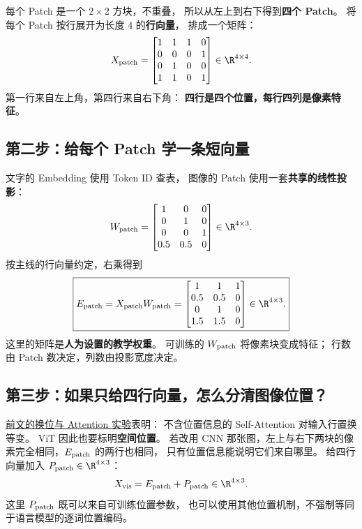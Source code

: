 每个 Patch 是一个 $2\times2$ 方块，不重叠，
所以从左上到右下得到\textbf{四个 Patch}。
将每个 Patch 按行展开为长度 $4$ 的\textbf{行向量}，
排成一个矩阵：
\begin{equation}
X_{\rm patch}=
\begin{bmatrix}
1&1&1&0\\
0&0&0&1\\
0&1&0&0\\
1&1&0&1
\end{bmatrix}\in\R^{4\times4}.
\label{eq:vit-four-patches}
\end{equation}
第一行来自左上角，第四行来自右下角：
\textbf{四行是四个位置，每行四列是像素特征}。

\subsection{第二步：给每个 Patch 学一条短向量}

文字的 Embedding 使用 Token ID 查表，
图像的 Patch 使用一套\textbf{共享的线性投影}：
\[
W_{\rm patch}=
\begin{bmatrix}
1&0&0\\
0&1&0\\
0&0&1\\
0.5&0.5&0
\end{bmatrix}\in\R^{4\times3}.
\]
按主线的行向量约定，右乘得到
\begin{equation}
\boxed{
E_{\rm patch}=X_{\rm patch}W_{\rm patch}
=\begin{bmatrix}
1&1&1\\
0.5&0.5&0\\
0&1&0\\
1.5&1.5&0
\end{bmatrix}\in\R^{4\times3}.
}
\label{eq:vit-patch-embedding}
\end{equation}
这里的矩阵是\textbf{人为设置的教学权重}。
可训练的 $W_{\rm patch}$ 将像素块变成特征；
行数由 Patch 数决定，列数由投影宽度决定。

\subsection{第三步：如果只给四行向量，怎么分清图像位置？}

\hyperref[intro:22a-position-multihead]{前文的换位与 Attention 实验}表明：
不含位置信息的 Self-Attention 对输入行置换等变。
ViT 因此也要标明\textbf{空间位置}。
若改用 CNN 那张图，左上与右下两块的像素完全相同，$E_{\rm patch}$ 的两行也相同，
只有位置信息能说明它们来自哪里。
给四行向量加入 $P_{\rm patch}\in\R^{4\times3}$：
\[
X_{\rm vis}=E_{\rm patch}+P_{\rm patch}\in\R^{4\times3}.
\]
这里 $P_{\rm patch}$ 既可以来自可训练位置参数，
也可以使用其他位置机制，不强制等同于语言模型的逐词位置编码。

